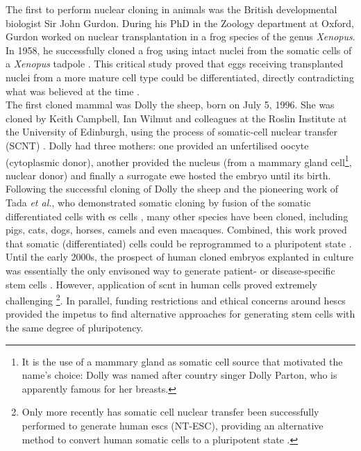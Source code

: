 The first to perform nuclear cloning in animals was the British developmental biologist Sir John Gurdon. 
During his PhD in the Zoology department at Oxford, Gurdon worked on nuclear transplantation in a frog species of the genus \textit{Xenopus}.
In 1958, he successfully cloned a frog using intact nuclei from the somatic cells of a \textit{Xenopus} tadpole \cite{gurdon1962developmental}.
This critical study proved that eggs receiving transplanted nuclei from a more mature cell type could be differentiated, directly contradicting what was believed at the time \cite{king1955changes}. \\

The first cloned mammal was Dolly the sheep, born on July 5, 1996.
She was cloned by Keith Campbell, Ian Wilmut and colleagues at the Roslin Institute at the University of Edinburgh, using the process of somatic-cell nuclear transfer (SCNT) \cite{wilmut1997viable}.
Dolly had three mothers: one provided an unfertilised oocyte (cytoplasmic donor), another provided the nucleus (from a mammary gland cell\footnote{It is the use of a mammary gland as somatic cell source that motivated the name's choice: Dolly was named after country singer Dolly Parton, who is apparently famous for her breasts.}, nuclear donor) and finally a surrogate ewe hosted the embryo until its birth.\\

Following the successful cloning of Dolly the sheep and the pioneering work of Tada \textit{et al.}, who demonstrated somatic cloning by fusion of the somatic differentiated cells with \gls{es} cells \cite{tada2001nuclear}, many other species have been cloned, including pigs, cats, dogs, horses, camels and even macaques.
Combined, this work proved that somatic (differentiated) cells could be reprogrammed to a pluripotent state \cite{cowan2005nuclear}.\\

Until the early 2000s, the prospect of human cloned embryos explanted in culture was essentially the only envisoned way to generate patient- or disease-specific stem cells \cite{yamanaka2007strategies}.
However, application of \gls{scnt} in human cells proved extremely challenging \cite{fulka2013ups}\footnote{Only more recently has somatic cell nuclear transfer been successfully performed to generate human \glspl{esc} (NT-ESC), providing an alternative method to convert human somatic cells to a pluripotent state \cite{tachibana2013human}.}. 
In parallel, funding restrictions and ethical concerns around \glspl{hesc} provided the impetus to find alternative approaches for generating stem cells with the same degree of pluripotency.

